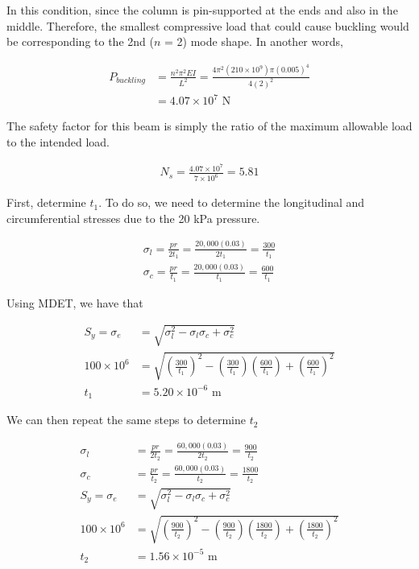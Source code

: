 \documentclass[
10pt,
a4paper,
openany,
svgnames,
]{book}
\begin{document}
\begin{evensolution}
\item In this condition, since the column is pin-supported at the ends and
  also in the middle. Therefore, the smallest compressive load that could
  cause buckling would be corresponding to the 2nd ($n$ = 2) mode shape. In
  another words,

  \begin{align*}
    P_{buckling} &= \frac{n^2 \pi^2 EI}{L^2} = \frac{4 \pi^2 (210 \times 10^9) \pi (0.005)^4}{4 (2)^2} \\
                 &= 4.07 \times 10^7 \text{ N}
  \end{align*}

  The safety factor for this beam is simply the ratio of the maximum allowable
  load to the intended load.

  \begin{align*}
    N_s = \frac{4.07 \times 10^7}{7 \times 10^6} = 5.81
  \end{align*}

\item First, determine $t_1$. To do so, we need to determine the
  longitudinal and circumferential stresses due to the 20 kPa pressure.

  \begin{align*}
    \sigma_l = \frac{pr}{2t_1} = \frac{20,000(0.03)}{2t_1} = \frac{300}{t_1} \\
    \sigma_c = \frac{pr}{t_1} = \frac{20,000(0.03)}{t_1} = \frac{600}{t_1}
  \end{align*}

  Using MDET, we have that

  \begin{align*}
    S_y = \sigma_e &= \sqrt{ \sigma_l^2 - \sigma_l\sigma_c + \sigma_c^2 } \\
    100 \times 10^6 &= \sqrt{ \left( \frac{300}{t_1} \right)^2 - \left( \frac{300}{t_1} \right) \left( \frac{600}{t_1} \right) + \left( \frac{600}{t_1} \right)^2 } \\
    t_1 &= 5.20 \times 10^{-6} \text{ m}
  \end{align*}

  We can then repeat the same steps to determine $t_2$

  \begin{align*}
    \sigma_l &= \frac{pr}{2t_2} = \frac{60,000(0.03)}{2t_2} = \frac{900}{t_2} \\
    \sigma_c &= \frac{pr}{t_2} = \frac{60,000(0.03)}{t_2} = \frac{1800}{t_2} \\
    S_y = \sigma_e &= \sqrt{ \sigma_l^2 - \sigma_l\sigma_c + \sigma_c^2 } \\
    100 \times 10^6 &= \sqrt{ \left( \frac{900}{t_2} \right)^2 - \left( \frac{900}{t_2} \right) \left( \frac{1800}{t_2} \right) + \left( \frac{1800}{t_2} \right)^2 } \\
    t_2 &= 1.56 \times 10^{-5} \text{ m}
  \end{align*}
\end{evensolution} 
\end{document}
